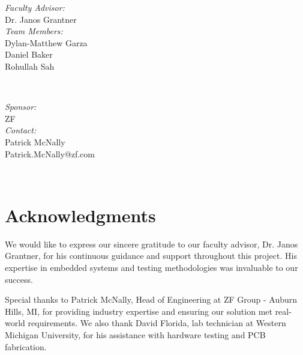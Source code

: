 \documentclass[12pt]{article}
\begin{document}
\begin{titlepage}

  \begin{minipage}{0.4\textwidth}
    \begin{flushleft} \large
      \emph{Faculty Advisor:}\\
      Dr. Janos Grantner\\ [.25cm]
      \emph{Team Members:}\\
      Dylan-Matthew Garza\\
      Daniel Baker\\
      Rohullah Sah
    \end{flushleft}
  \end{minipage}
  ~
  \begin{minipage}{0.4\textwidth}
    \begin{flushright} \large
      \emph{Sponsor:} \\
      ZF
      \\\emph{Contact:}\\
      Patrick McNally\\ 
      Patrick.McNally@zf.com
    \end{flushright}
  \end{minipage}\\[1cm]


  \begin{flushleft} \large
  \end{flushleft}

  \vfill 

\end{titlepage}
\onehalfspacing
\section*{Acknowledgments}

We would like to express our sincere gratitude to our faculty advisor, Dr. Janos Grantner, for his continuous guidance and support throughout this project. His expertise in embedded systems and testing methodologies was invaluable to our success.

Special thanks to Patrick McNally, Head of Engineering at ZF Group - Auburn Hills, MI, for providing industry expertise and ensuring our solution met real-world requirements. We also thank David Florida, lab technician at Western Michigan University, for his assistance with hardware testing and PCB fabrication.
\end{document}

